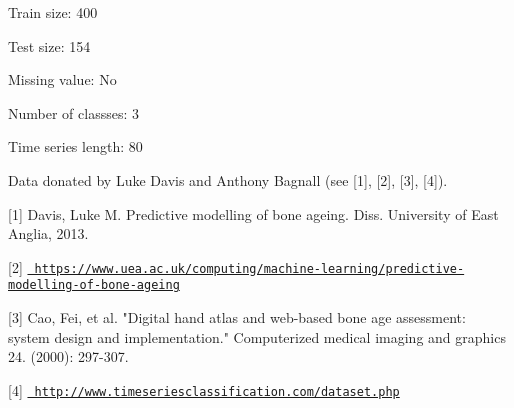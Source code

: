 Train size\+: 400

Test size\+: 154

Missing value\+: No

Number of classses\+: 3

Time series length\+: 80

Data donated by Luke Davis and Anthony Bagnall (see \mbox{[}1\mbox{]}, \mbox{[}2\mbox{]}, \mbox{[}3\mbox{]}, \mbox{[}4\mbox{]}).

\mbox{[}1\mbox{]} Davis, Luke M. Predictive modelling of bone ageing. Diss. University of East Anglia, 2013.

\mbox{[}2\mbox{]} \href{https://www.uea.ac.uk/computing/machine-learning/predictive-modelling-of-bone-ageing}{\texttt{ https\+://www.\+uea.\+ac.\+uk/computing/machine-\/learning/predictive-\/modelling-\/of-\/bone-\/ageing}}

\mbox{[}3\mbox{]} Cao, Fei, et al. "{}\+Digital hand atlas and web-\/based bone age assessment\+: system design and implementation."{} Computerized medical imaging and graphics 24. (2000)\+: 297-\/307.

\mbox{[}4\mbox{]} \href{http://www.timeseriesclassification.com/dataset.php}{\texttt{ http\+://www.\+timeseriesclassification.\+com/dataset.\+php}} 